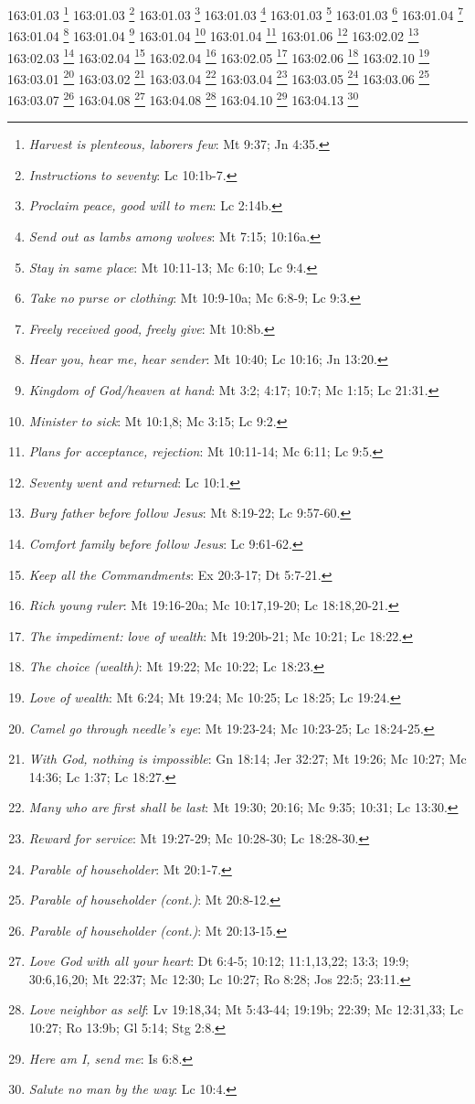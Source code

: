 {{{{{{{{{{{{{{{{{{{{{{{{{{{{{{{{{{{{163:01.03 \footnote{\textit{Harvest is plenteous, laborers few}: Mt 9:37; Jn 4:35.}
163:01.03 \footnote{\textit{Instructions to seventy}: Lc 10:1b-7.}
163:01.03 \footnote{\textit{Proclaim peace, good will to men}: Lc 2:14b.}
163:01.03 \footnote{\textit{Send out as lambs among wolves}: Mt 7:15; 10:16a.}
163:01.03 \footnote{\textit{Stay in same place}: Mt 10:11-13; Mc 6:10; Lc 9:4.}
163:01.03 \footnote{\textit{Take no purse or clothing}: Mt 10:9-10a; Mc 6:8-9; Lc 9:3.}
163:01.04 \footnote{\textit{Freely received good, freely give}: Mt 10:8b.}
163:01.04 \footnote{\textit{Hear you, hear me, hear sender}: Mt 10:40; Lc 10:16; Jn 13:20.}
163:01.04 \footnote{\textit{Kingdom of God/heaven at hand}: Mt 3:2; 4:17; 10:7; Mc 1:15; Lc 21:31.}
163:01.04 \footnote{\textit{Minister to sick}: Mt 10:1,8; Mc 3:15; Lc 9:2.}
163:01.04 \footnote{\textit{Plans for acceptance, rejection}: Mt 10:11-14; Mc 6:11; Lc 9:5.}
163:01.06 \footnote{\textit{Seventy went and returned}: Lc 10:1.}
163:02.02 \footnote{\textit{Bury father before follow Jesus}: Mt 8:19-22; Lc 9:57-60.}
163:02.03 \footnote{\textit{Comfort family before follow Jesus}: Lc 9:61-62.}
163:02.04 \footnote{\textit{Keep all the Commandments}: Ex 20:3-17; Dt 5:7-21.}
163:02.04 \footnote{\textit{Rich young ruler}: Mt 19:16-20a; Mc 10:17,19-20; Lc 18:18,20-21.}
163:02.05 \footnote{\textit{The impediment: love of wealth}: Mt 19:20b-21; Mc 10:21; Lc 18:22.}
163:02.06 \footnote{\textit{The choice (wealth)}: Mt 19:22; Mc 10:22; Lc 18:23.}
163:02.10 \footnote{\textit{Love of wealth}: Mt 6:24; Mt 19:24; Mc 10:25; Lc 18:25; Lc 19:24.}
163:03.01 \footnote{\textit{Camel go through needle's eye}: Mt 19:23-24; Mc 10:23-25; Lc 18:24-25.}
163:03.02 \footnote{\textit{With God, nothing is impossible}: Gn 18:14; Jer 32:27; Mt 19:26; Mc 10:27; Mc 14:36; Lc 1:37; Lc 18:27.}
163:03.04 \footnote{\textit{Many who are first shall be last}: Mt 19:30; 20:16; Mc 9:35; 10:31; Lc 13:30.}
163:03.04 \footnote{\textit{Reward for service}: Mt 19:27-29; Mc 10:28-30; Lc 18:28-30.}
163:03.05 \footnote{\textit{Parable of householder}: Mt 20:1-7.}
163:03.06 \footnote{\textit{Parable of householder (cont.)}: Mt 20:8-12.}
163:03.07 \footnote{\textit{Parable of householder (cont.)}: Mt 20:13-15.}
163:04.08 \footnote{\textit{Love God with all your heart}: Dt 6:4-5; 10:12; 11:1,13,22; 13:3; 19:9; 30:6,16,20; Mt 22:37; Mc 12:30; Lc 10:27; Ro 8:28; Jos 22:5; 23:11.}
163:04.08 \footnote{\textit{Love neighbor as self}: Lv 19:18,34; Mt 5:43-44; 19:19b; 22:39; Mc 12:31,33; Lc 10:27; Ro 13:9b; Gl 5:14; Stg 2:8.}
163:04.10 \footnote{\textit{Here am I, send me}: Is 6:8.}
163:04.13 \footnote{\textit{Salute no man by the way}: Lc 10:4.}
}}}}}}}}}}}}}}}}}}}}}}}}}}}}}}}}}}}}
